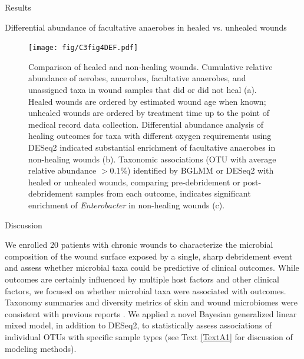 \documentclass[oneside,12pt,final]{sty/ucthesis-CA2012}
\begin{document}
\begin{mainmatter}
\begin{section}{Results}
\begin{subsection}{Differential abundance of facultative anaerobes in healed vs. unhealed wounds}
\begin{figure}
\centering
\centerline{\texttt{[image: fig/C3fig4DEF.pdf]}}
\caption{Comparison of healed and non-healing wounds. Cumulative relative abundance of aerobes, anaerobes, facultative anaerobes, and unassigned taxa in wound samples that did or did not heal (a). Healed wounds are ordered by estimated wound age when known; unhealed wounds are ordered by treatment time up to the point of medical record data collection. Differential abundance analysis of healing outcomes for taxa with different oxygen requirements using DESeq2 indicated substantial enrichment of facultative anaerobes in non-healing wounds (b). Taxonomic associations (OTU with average relative abundance $> 0.1$\%) identified by BGLMM or DESeq2 with healed or unhealed wounds, comparing pre-debridement or post-debridement samples from each outcome, indicates significant enrichment of \textit{Enterobacter} in non-healing wounds (c).}
\label{fig:fig4DEF}
\end{figure}


\end{subsection}

\end{section}

\begin{section}{Discussion}

We enrolled 20 patients with chronic wounds to characterize the microbial composition of the wound surface exposed by a single, sharp debridement event and assess whether microbial taxa could be predictive of clinical outcomes. While outcomes are certainly influenced by multiple host factors and other clinical factors, we focused on whether microbial taxa were associated with outcomes. Taxonomy summaries and diversity metrics of skin and wound microbiomes were consistent with previous reports \cite{RN6, RN7, RN8, RN36}. We applied a novel Bayesian generalized linear mixed model, in addition to DESeq2, to statistically assess associations of individual OTUs with specific sample types (see Text \ref{TextA1} for discussion of modeling methods).


\end{section}
\end{mainmatter}
\end{document}

